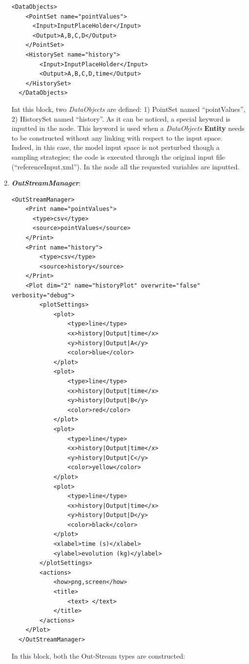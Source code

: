 \begin{enumerate}
\begin{lstlisting}[style=XML,morekeywords={arg,extension,pauseAtEnd,overwrite}]
  <DataObjects>
    <PointSet name="pointValues">
      <Input>InputPlaceHolder</Input>
      <Output>A,B,C,D</Output>
    </PointSet>
    <HistorySet name="history">
        <Input>InputPlaceHolder</Input>
        <Output>A,B,C,D,time</Output>
    </HistorySet>
  </DataObjects>
\end{lstlisting}
  Int this block, two \textit{DataObjects} are defined: 1) PointSet named ``pointValues'', 2) HistorySet named ``history''.
  As it can be noticed, a special keyword is inputted in the  node. This keyword is used when a \textit{DataObjects}  \textbf{Entity} needs to be constructed without any linking with respect to the input space. Indeed, in 
  this case, the model input space is not perturbed though a sampling strategies; the code is executed through the original
   input file   (``referenceInput.xml''). In the  node all the requested variables are inputted.
   \item \textbf{\textit{OutStreamManager}}:   
\begin{lstlisting}[style=XML,morekeywords={arg,extension,pauseAtEnd,overwrite}]
  <OutStreamManager>
    <Print name="pointValues">
      <type>csv</type>
      <source>pointValues</source>
    </Print>
    <Print name="history">
        <type>csv</type>
        <source>history</source>
    </Print>
    <Plot dim="2" name="historyPlot" overwrite="false" verbosity="debug">
        <plotSettings>
            <plot>
                <type>line</type>
                <x>history|Output|time</x>
                <y>history|Output|A</y>
                <color>blue</color>
            </plot>
            <plot>
                <type>line</type>
                <x>history|Output|time</x>
                <y>history|Output|B</y>
                <color>red</color>
            </plot>
            <plot>
                <type>line</type>
                <x>history|Output|time</x>
                <y>history|Output|C</y>
                <color>yellow</color>
            </plot>
            <plot>
                <type>line</type>
                <x>history|Output|time</x>
                <y>history|Output|D</y>
                <color>black</color>
            </plot>
            <xlabel>time (s)</xlabel>
            <ylabel>evolution (kg)</ylabel>
        </plotSettings>
        <actions>
            <how>png,screen</how>
            <title>
                <text> </text>
            </title>
        </actions>
    </Plot>
  </OutStreamManager>
\end{lstlisting}
  In this block, both the Out-Stream types are constructed: 

\end{enumerate}
